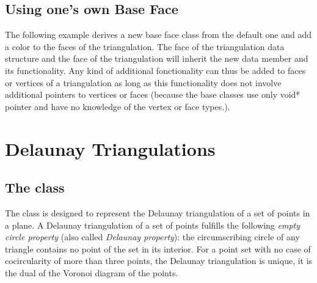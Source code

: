 \subsection{Using one's own Base Face}
The following example derives a new base face class from the default
one and add a color to the faces of the triangulation. 
The face of the triangulation data structure
and the face of the triangulation will inherit the new data member 
and its functionality.
Any kind of additional fonctionality can thus be added to faces or vertices of a triangulation 
as long as this functionality  does not involve additional pointers to vertices or faces
(because the base classes use only void* pointer and have no knowledge
of the vertex or face types.).

\ccExample
{}



\section{Delaunay Triangulations}
\label{I1_Sect_Delaunay}


\subsection{The class \protect {}}
The class  is designed to represent
the Delaunay triangulation of a set of points in a plane.
A  Delaunay triangulation of a set of points
fulfills
the following {\em empty circle property} 
(also called {\em Delaunay property}): the circumscribing
circle of any triangle 
contains no point of the set in its interior.
For a point set with no case of cocircularity 
of more than three points,
the Delaunay triangulation is unique, it is  the dual
of the Voronoi diagram of the points.



